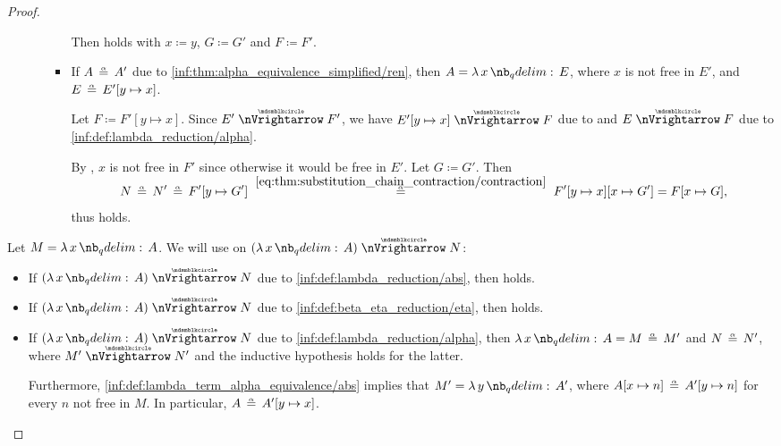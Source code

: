 \begin{proof}
\begin{itemize}
\begin{itemize}
\begin{itemize}
        Then  holds with \( x \coloneqq y \), \( G \coloneqq G' \) and \( F \coloneqq F' \).

        \item If \( A \aequiv A' \) due to \ref{inf:thm:alpha_equivalence_simplified/ren}, then \( A = \qabs x E \), where \( x \) is not free in \( E' \), and \( E \aequiv E'[y \mapsto x] \).

        Let \( F \coloneqq F'[y \mapsto x] \). Since \( E' \ppred F' \), we have \( E'[y \mapsto x] \ppred F \) due to  and \( E \ppred F \) due to \ref{inf:def:lambda_reduction/alpha}.

        By , \( x \) is not free in \( F' \) since otherwise it would be free in \( E' \). Let \( G \coloneqq G' \). Then
        \begin{equation*}
          N
          \aequiv
          N'
          \aequiv
          F'[y \mapsto G']
          \reloset {\eqref{eq:thm:substitution_chain_contraction/contraction}} \aequiv
          F'[y \mapsto x][x \mapsto G']
          =
          F[x \mapsto G],
        \end{equation*}
        thus  holds.
      \end{itemize}
    \end{itemize}
  \end{itemize}

   Let \( M = \qabs x A \). We will use  on \( (\qabs x A) \ppred N \):
  \begin{itemize}
    \item If \( (\qabs x A) \ppred N \) due to \ref{inf:def:lambda_reduction/abs}, then  holds.

    \item If \( (\qabs x A) \ppred N \) due to \ref{inf:def:beta_eta_reduction/eta}, then  holds.

    \item If \( (\qabs x A) \ppred N \) due to \ref{inf:def:lambda_reduction/alpha}, then \( \qabs x A = M \aequiv M' \) and \( N \aequiv N' \), where \( M' \ppred N' \) and the inductive hypothesis holds for the latter.

    Furthermore, \ref{inf:def:lambda_term_alpha_equivalence/abs} implies that \( M' = \qabs y A' \), where \( A[x \mapsto n] \aequiv A'[y \mapsto n] \) for every \( n \) not free in \( M \). In particular, \( A \aequiv A'[y \mapsto x] \).


\end{itemize}
\end{proof}
